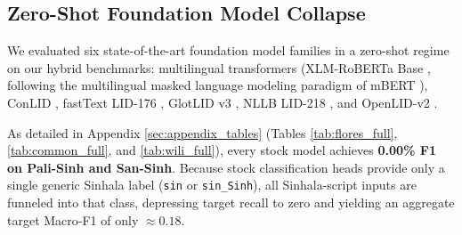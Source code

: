 \documentclass[11pt]{article}
\begin{document}
\subsection{Zero-Shot Foundation Model Collapse}
We evaluated six state-of-the-art foundation model families in a zero-shot regime on our hybrid benchmarks: multilingual transformers (XLM-RoBERTa Base \cite{conneau2020unsupervised}, following the multilingual masked language modeling paradigm of mBERT \cite{devlin2019bert}), ConLID \cite{dunn2023commonlid}, fastText LID-176 \cite{joulin2017bag}, GlotLID v3 \cite{kargaran2023glotlid}, NLLB LID-218 \cite{nllb2022}, and OpenLID-v2 \cite{burchell2023openlid}.

As detailed in Appendix \ref{sec:appendix_tables} (Tables \ref{tab:flores_full}, \ref{tab:common_full}, and \ref{tab:wili_full}), every stock model achieves \textbf{0.00\% F1 on Pali-Sinh and San-Sinh}. Because stock classification heads provide only a single generic Sinhala label (\texttt{sin} or \texttt{sin\_Sinh}), all Sinhala-script inputs are funneled into that class, depressing target recall to zero and yielding an aggregate target Macro-F1 of only $\approx 0.18$.
\end{document}
